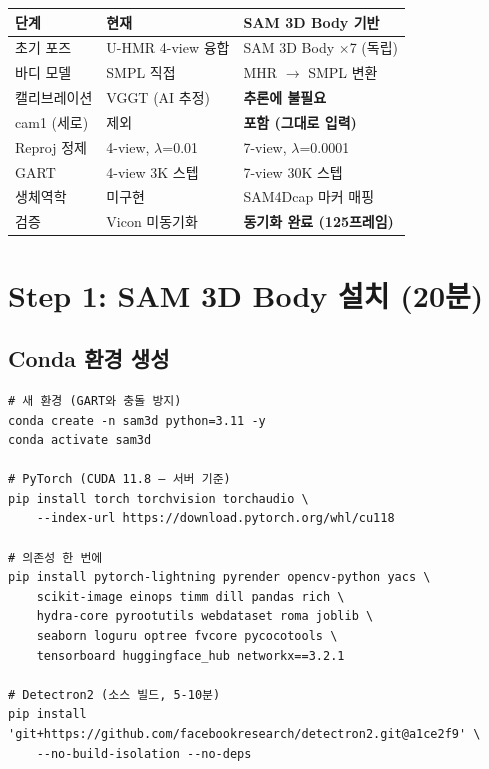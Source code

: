 \documentclass[11pt, a4paper]{report}
\begin{document}
\begin{center}
\renewcommand{\arraystretch}{1.3}
\begin{tabular}{p{3cm}p{5cm}p{5cm}}
\toprule
\textbf{단계} & \textbf{현재} & \textbf{SAM 3D Body 기반} \\
\midrule
초기 포즈 & U-HMR 4-view 융합 & SAM 3D Body $\times$7 (독립) \\
바디 모델 & SMPL 직접 & MHR $\to$ SMPL 변환 \\
캘리브레이션 & VGGT (AI 추정) & \textbf{추론에 불필요} \\
cam1 (세로) & 제외 & \textbf{포함 (그대로 입력)} \\
Reproj 정제 & 4-view, $\lambda$=0.01 & 7-view, $\lambda$=0.0001 \\
GART & 4-view 3K 스텝 & 7-view 30K 스텝 \\
생체역학 & 미구현 & SAM4Dcap 마커 매핑 \\
검증 & Vicon 미동기화 & \textbf{동기화 완료 (125프레임)} \\
\bottomrule
\end{tabular}
\end{center}


\chapter{Step 1: SAM 3D Body 설치 (20분)}

\section{Conda 환경 생성}

\begin{codebox}[title={서버 명령어}]
\begin{verbatim}
# 새 환경 (GART와 충돌 방지)
conda create -n sam3d python=3.11 -y
conda activate sam3d

# PyTorch (CUDA 11.8 — 서버 기준)
pip install torch torchvision torchaudio \
    --index-url https://download.pytorch.org/whl/cu118

# 의존성 한 번에
pip install pytorch-lightning pyrender opencv-python yacs \
    scikit-image einops timm dill pandas rich \
    hydra-core pyrootutils webdataset roma joblib \
    seaborn loguru optree fvcore pycocotools \
    tensorboard huggingface_hub networkx==3.2.1

# Detectron2 (소스 빌드, 5-10분)
pip install 'git+https://github.com/facebookresearch/detectron2.git@a1ce2f9' \
    --no-build-isolation --no-deps
\end{verbatim}
\end{codebox}
\end{document}
